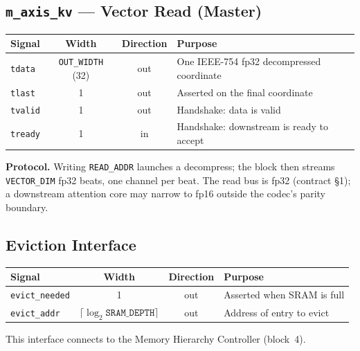 \documentclass[11pt]{article}
\begin{document}
\subsection{\texttt{m\_axis\_kv} --- Vector Read (Master)}
\label{sec:m_axis_kv}

\begin{table}[h]
\centering
\small
\begin{tabular}{@{}l c c p{8cm}@{}}
\toprule
Signal      & Width                    & Direction & Purpose \\
\midrule
\texttt{tdata}  & \texttt{OUT\_WIDTH} (32) & out    & One IEEE-754 fp32 decompressed coordinate \\
\texttt{tlast}  & 1                       & out       & Asserted on the final coordinate \\
\texttt{tvalid} & 1                       & out       & Handshake: data is valid \\
\texttt{tready} & 1                       & in        & Handshake: downstream is ready to accept \\
\bottomrule
\end{tabular}
\end{table}

\noindent\textbf{Protocol.} Writing \texttt{READ\_ADDR} launches a decompress; the
block then streams \texttt{VECTOR\_DIM} fp32 beats, one channel per beat. The
read bus is fp32 (contract \S1); a downstream attention core may narrow to fp16
outside the codec's parity boundary.

\subsection{Eviction Interface}
\label{sec:evict}

\begin{table}[h]
\centering
\small
\begin{tabular}{@{}l c c p{8cm}@{}}
\toprule
Signal             & Width                         & Direction & Purpose \\
\midrule
\texttt{evict\_needed} & 1                         & out       & Asserted when SRAM is full \\
\texttt{evict\_addr}   & $\lceil\log_2 \texttt{SRAM\_DEPTH}\rceil$ & out & Address of entry to evict \\
\bottomrule
\end{tabular}
\end{table}

\noindent This interface connects to the Memory Hierarchy Controller (block~4).
\end{document}
